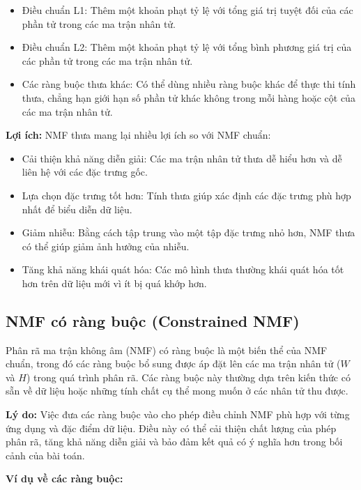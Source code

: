 \begin{itemize}
\item
  Điều chuẩn L1: Thêm một khoản phạt tỷ lệ với tổng giá trị tuyệt đối của các phần tử trong các ma trận nhân tử.
\item
  Điều chuẩn L2: Thêm một khoản phạt tỷ lệ với tổng bình phương giá trị của các phần tử trong các ma trận nhân tử.
\item
  Các ràng buộc thưa khác: Có thể dùng nhiều ràng buộc khác để thực thi tính thưa, chẳng hạn giới hạn số phần tử khác không trong mỗi hàng hoặc cột của các ma trận nhân tử.
\end{itemize}

\textbf{Lợi ích:} NMF thưa mang lại nhiều lợi ích so với NMF chuẩn:

\begin{itemize}
\item
  Cải thiện khả năng diễn giải: Các ma trận nhân tử thưa dễ hiểu hơn và dễ liên hệ với các đặc trưng gốc.
\item
  Lựa chọn đặc trưng tốt hơn: Tính thưa giúp xác định các đặc trưng phù hợp nhất để biểu diễn dữ liệu.
\item
  Giảm nhiễu: Bằng cách tập trung vào một tập đặc trưng nhỏ hơn, NMF thưa có thể giúp giảm ảnh hưởng của nhiễu.
\item
  Tăng khả năng khái quát hóa: Các mô hình thưa thường khái quát hóa tốt hơn trên dữ liệu mới vì ít bị quá khớp hơn.
\end{itemize}

\subsection{NMF có ràng buộc (Constrained NMF)}

Phân rã ma trận không âm (NMF) có ràng buộc là một biến thể của NMF chuẩn, trong đó các ràng buộc bổ sung được áp đặt lên các ma trận nhân tử (\(W\) và \(H\)) trong quá trình phân rã. Các ràng buộc này thường dựa trên kiến thức có sẵn về dữ liệu hoặc những tính chất cụ thể mong muốn ở các nhân tử thu được.

\textbf{Lý do:} Việc đưa các ràng buộc vào cho phép điều chỉnh NMF phù hợp với từng ứng dụng và đặc điểm dữ liệu. Điều này có thể cải thiện chất lượng của phép phân rã, tăng khả năng diễn giải và bảo đảm kết quả có ý nghĩa hơn trong bối cảnh của bài toán.

\textbf{Ví dụ về các ràng buộc:}


